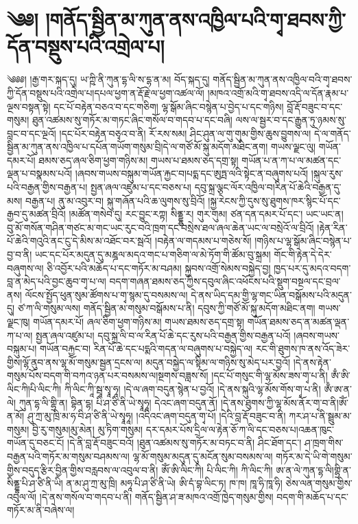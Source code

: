 \setcounter{footnote}{0} 
\chapter{༄༅། །གནོད་སྦྱིན་མ་ཀུན་ནས་འཁྱིལ་པའི་གྭ་ཐབས་ཀྱི་དོན་བསྡུས་པའི་འགྲེལ་པ། }༄༅༅། །རྒྱ་གར་སྐད་དུ། ཡ་ཀྵི་ནི་ཀུན་དྷ་ལི་ས་དྷ་ན་མ། བོད་སྐད་དུ། གནོད་སྦྱིན་མ་ཀུན་ནས་འཁྱིལ་བའི་གྭ་ཐབས་ཀྱི་དོན་བསྡུས་པའི་འགྲེལ་པ།དཔལ་ཕྱག་ན་རྡོ་རྗེ་ལ་ཕྱག་འཚལ་ལོ། །མཁའ་འགྲོ་མའི་གྭ་ཐབས་འདི་ལ་དོན་རྣམ་པ་ལྔས་བསྟན་སྟེ། དང་པོ་བརྟེན་བཅའ་བ་དང་གཅིག། ལྷ་སྒོམ་ཞིང་བསྙེན་པ་བྱེད་པ་དང་གཉིས། བློ་རྡོ་བཟུང་བ་དང་གསུམ། ཐུན་འཚམས་སུ་གཏོར་མ་གཏང་ཞིང་གསོལ་བ་གདབ་པ་དང་བཞི། ལས་ལ་སྦྱར་བ་དང་རྒྱུན་ཏུ་ཉམས་སུ་བླང་བ་དང་ལྔའོ། །དང་པོར་བརྟེན་བཅྭའ་བ་ནི། རོ་རས་སམ། ཤིང་ཤུན་ལ་གུ་གུམ་གྱིས་ཆུས་བྱུགས་ལ། དེ་ལ་གནོད་སྦྱིན་མ་ཀུན་ནས་འཁྱིལ་པ་དཔོན་གཡོག་གསུམ་བྲི།དེ་ལ་གཙོ་མོ་སྐུ་མདོག་མཐིང་ནག། གཡས་ལྗང་ལུ། གཡོན་དམར་པོ། ཐམས་ཅད་ཞལ་ཅིག་ཕྱག་གཉིས་མ། གཡས་པ་ཐམས་ཅད་དགྲ་སྟ། གཡོན་པ་ན་ཀ་པ་ལ་མཚན་དང་ལྡན་པ་བསྣམས་པའོ། །ཞབས་གཡས་བསྐུམ་གཡོན་རྐྱང་བ།པདྨ་དང་ཨུཏྤ་ལའི་སྟེང་ན་བཞུགས་པའོ། །སྐུལ་རུས་པའི་བརྒྱན་གྱིས་བརྒྱན་པ། སྤྱན་ཞལ་འཛུམ་པ་དང་བཅས་པ། དབུ་སྐྲ་ལྕང་ལོར་འཁྱིལ་བ།རིན་པོ་ཆེའི་བརྒྱན་དུ་མས། བརྒྱན་པ། ནུ་མ་འབུར་བ། སྐུ་གཞོན་པའི་ཆ་ལུགས་སུ་བྲིའོ། །སྐྱ་རེངས་ཀྱི་དུས་སུ་ཐུགས་ཁར་སྙིང་པོ་དང་རྒྱབ་དུ་མཚན་བྲིའོ། །མཚོན་གསེབ་དུ། རང་བྱུང་རཀྟ། སིནྡྷུ་ར། གུར་གུམ། ཙན་དན་དམར་པོ་དང་། ཡང་ཡང་ན། བུ་མོ་གསོན་གཤིན་གཙང་མ་གང་ཡང་རུང་བའི་ཁྲག་དང་བསྲེས་ཐལ་ཞལ་ཆེན་ཡང་ལ་བསྲེའོ་ལ་བྲིའོ། །རྟེན་རིན་པོ་ཆེའི་གའུའི་ནང་ངུ་དེ་མིས་མ་འཐོང་བར་སྦའོ། །བརྟེན་ལ་གདམས་པ་གཅེས་སོ། །གཉིས་པ་ལྷ་སྒོམ་ཞིང་བསྙེན་པ་བྱ་བ་ནི། ཡང་དང་པོར་མདུན་དུ་མཎྜལ་མདའ་གང་པ་གཅིག་ལ་མེ་ཏོག་གི་ཚོམ་བུ་སྐྲམ། གོང་གི་རྟེན་དེ་དེར་བཞུགས་ལ། ཅི་འབྱོར་པའི་མཆོད་པ་དང་གཏོར་མ་བཤམ། སྐྱབས་འགྲོ་སེམས་བསྐྱེད་བྱ། ཁྱད་པར་དུ་མདའ་བདག་བླ་ན་མེད་པའི་བྱང་ཆུབ་གྭ་པ་ལ། བདག་གཞན་ཐམས་ཅད་ཀྱིས་དབུལ་ཞིང་འཕོངས་པའི་སྡུག་བསྔལ་དང་བྲལ་ནས། ལོངས་སྤྱོད་ཕུན་སུམ་ཚོགས་པ་གྭ་སྙམ་དུ་བསམས་ལ། དེ་ནས་ཡིད་དམ་གྱི་ལྷ་གང་ཡིན་བསྒོམས་པའི་མདུན་དུ། ཙ་ཀ་ལི་གསུམ་ལས། གནོད་སྦྱིན་མ་གསུམ་བསྒོམས་པ་ནི། དབུས་ཀྱི་གཙོ་མོ་སྐུ་མདོག་མཐིང་ནག། གཡས་ལྗང་ཁུ། གཡོན་དམར་པོ། ཞལ་ཅིག་ཕྱག་གཉིས་མ། གཡས་ཐམས་ཅད་དགྲ་སྟ། གཡོན་ཐམས་ཅད་ན་མཚན་ལྡན་ཀ་པ་ལ། སྤྱན་ཞལ་འཛུམ་པ། དབུ་སྐྲ་ལི་བ་ལ་རིན་པོ་ཆེ་དང་རུས་པའི་བརྒྱན་གྱིས་བརྒྱན་པའོ། །ཞབས་གཡས་བསྐུམ་པ། གཡོན་བརྐྱང་བ། རིན་པོ་ཆེ་དང་པདྨའི་གདན་ལ་བཞུགས་པ་བསྐྱེད་ལ། རང་གི་ཐུགས་ཁ་ནས་འོད་ཟེར་གྱིས།ལྷོ་ནུབ་ནས་ལྷ་མོ་གསུམ་སྦྱན་དྲངས་ལ། མདུན་བསྐྱེད་ལ་སྟིམ་ལ་གཉིས་སུ་མེད་པར་བྱའོ། །དེ་ནས་རྟེན་གསུམ་པོས་བདག་གི་བཀའ་ཉན་པར་བསམས་ལ།སྔགས་བཟླས་སོ། །དང་པོ་གསུང་གི་ལྷ་མོས་ཟས་གྭ་པ་ནི། ཨྃ་ཨི་ལིང་ཀི།པི་ལིང་ཀི། ཀི་ལིང་ཀཱི་སྦཱ་སྭཱ་ཧཱ། །དེ་ལ་ཞག་བདུན་སྙེན་པ་བྱའོ། །དེ་ནས་སྐུའི་ལྷ་མོས་གོས་གྭ་པ་ནི། ཨྃ་ཨ་ན་ལེ། ཀུན་དྷ་ལི་གྷྲི་ན། བྷིན་དྷ། པི་ཤ་ཙི་ནི་ཡེ་སྭཱཧཱ། དེའང་ཞག་བདུན་ནོ། །དེ་ནས་ཐུགས་ཀྱི་ལྷ་མོས་ནོར་གྭ་བ་ནི།ཨོཾ་ན་མོ། ཤུ་ཀྲ་མུ་ཁྲི་མ་ཧ་བི་ཤ་ཙི་ནི་ཡེ་སྭཱཧཱ། །འདིའང་ཞག་བདུན་གྭ་པོ། །དེའི་བླ་རྡོ་བཟུང་བ་ནི། ཀར་ཤ་པ་ནི་སྦྲུམ་མ་གསུམ། བྱི་རུ་གསུམ།མུ་མེན། མུ་ཏིག་གསུམ། དར་དམར་པོས་དྲིལ་ལ་རྟེན་ཅོ་ཀ་ལི་དང་བཅས་པ།འཆན་ཁུང་གཡོན་དུ་བཅང་ངོ། །དེ་ནི་བླ་རྡོ་བཟུང་བའོ། །ཐུན་འཚམས་སུ་གཏོར་མ་བཏང་བ་ནི། ཤིང་ཐོག་དང་། ཤ་ཁྲག་གིས་བརྒྱན་པའི་གཏོར་མ་གསུམ་བཤམས་ལ། ལྷ་མོ་གསུམ་མདུན་དུ་མངོན་སུམ་བསམས་ལ། གཏོར་མ་དེ་ཡི་གེ་གསུམ་གྱིས་བདུད་རྩིར་བྱིན་གྱིས་བརླབས་ལ་འབུལ་བ་ནི། ཨོཾ་ཨི་ལིང་ཀི། པི་ལིང་ཀི། ཀི་ལིང་ཀི། ཨ་ན་ལེ་ཀུན་དྷ་ལི།གྷྲི་ན་སིནྡྷ་པི་ཤ་ཙི་ནི་ཡི། ན་མ་ཤུ་ཀྲ་མུ་ཁྲི། མཧཱ་པི་ཤ་ཙི་ནི་ཡེ། ཨི་དཾ་བྷ་ལིང་ཏ། ཁ་ཁ། ཁཱ་ཧི་ཁཱ་ཧི། ཅེས་ལན་གསུམ་གྱིས་འབུལ་ལོ། །དེ་ནས་གསོལ་བ་གདབ་པ་ནི། གནོད་སྦྱིན་ཤ་ཟ་མཁའ་འགྲོ་ཁྱེད་གསུམ་གྱིས། བདག་གི་མཆོད་པ་དང་གཏོར་མ་ནི་བཞེས་ལ། 